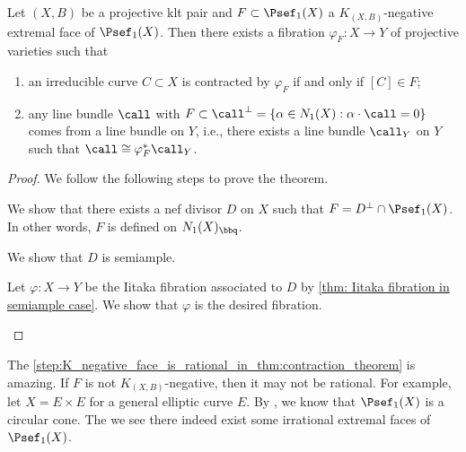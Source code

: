     \begin{theorem}\label{thm: contraction theorem}
        Let \((X,B)\) be a projective klt pair and \(F \subset \Psef_1(X)\) a \(K_{(X,B)}\)-negative extremal face of \(\Psef_1(X)\).
        Then there exists a fibration \(\varphi_F: X \to Y\) of projective varieties such that
        \begin{enumerate}
            \item an irreducible curve \(C \subset X\) is contracted by \(\varphi_F\) if and only if \([C] \in F\);
            \item any line bundle \(\call\) with \(F \subset \call^{\perp} = \{\alpha \in N_1(X) : \alpha \cdot \call = 0\}\) comes from a line bundle on \(Y\), 
                i.e., there exists a line bundle \(\call_Y\) on \(Y\) such that \(\call \cong \varphi_F^* \call_Y\).
        \end{enumerate}
    \end{theorem}
    \begin{proof}
        We follow the following steps to prove the theorem.
        \begin{step}\label{step:K_negative_face_is_rational_in_thm:contraction_theorem}
            We show that there exists a nef divisor \(D\) on \(X\) such that \(F = D^\perp \cap \Psef_1(X)\).
            In other words, \(F\) is defined on \(N_1(X)_\bbq\).
        \end{step}

        \begin{step}
            We show that \(D\) is semiample.
        \end{step}

        \begin{step}
            Let \(\varphi: X \to Y\) be the Iitaka fibration associated to \(D\) by \cref{thm: Iitaka fibration in semiample case}.
            We show that \(\varphi\) is the desired fibration.
        \end{step}
    \end{proof}
    \begin{remark}\label{rmk_K_negative_face_is_rational}
        The \cref{step:K_negative_face_is_rational_in_thm:contraction_theorem} is amazing.
        If \(F\) is not \(K_{(X,B)}\)-negative, then it may not be rational.
        For example, let \(X = E \times E\) for a general elliptic curve \(E\).
        By \cite[Lemma 1.5.4]{Laz04a}, we know that \(\Psef_1(X)\) is a circular cone.
        The we see there indeed exist some irrational extremal faces of \(\Psef_1(X)\).
    \end{remark}

    